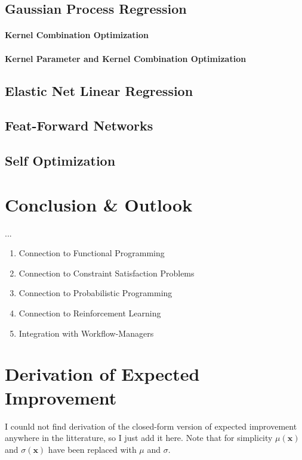 \documentclass[english]{article}
\newcommand{\x}{\mathbf{x}}
\begin{document}
\subsection{Gaussian Process Regression}
\paragraph{Kernel Combination Optimization}
\paragraph{Kernel Parameter and Kernel Combination Optimization}
\subsection{Elastic Net Linear Regression}
\subsection{Feat-Forward Networks}
\subsection{Self Optimization}

\section{Conclusion \& Outlook}
...

\begin{enumerate}
  \item{Connection to Functional Programming}
  \item{Connection to Constraint Satisfaction Problems}
  \item{Connection to Probabilistic Programming}
  \item{Connection to Reinforcement Learning}
  \item{Integration with Workflow-Managers}
\end{enumerate}



\appendix

\section{Derivation of Expected Improvement}
\label{EI derivation}
I counld not find derivation of the closed-form version of expected improvement anywhere in the litterature, so I just add it here. Note that for simplicity $\mu(\x)$ and $\sigma(\x)$ have been replaced with $\mu$ and $\sigma$.
\end{document}
